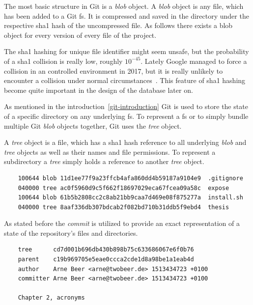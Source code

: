 The most basic structure in Git is a \emph{blob} object.
A \emph{blob} object is any file, which has been added to a Git \ac{fs}.
It is compressed and saved in the  directory under the respective \ac{sha1} hash of the uncompressed file.
As follows there exists a blob object for every version of every file of the project.

The \ac{sha1} hashing for unique file identifier might seem unsafe, but the probability of a \ac{sha1} collision is really low, roughly $10^{-45}$.
Lately Google managed to force a collision in an controlled environment in 2017, but it is really unlikely to encounter a collision under normal circumstances~\cite{techreport:sha-collision}.
This feature of \ac{sha1} hashing become quite important in the design of the database later on.

As mentioned in the introduction~\ref{git-introduction} Git is used to store the state of a specific directory on any underlying \ac{fs}.
To represent a \ac{fs} or to simply bundle multiple Git \emph{blob} objects together, Git uses the \emph{tree} object.

A \emph{tree} object is a file, which has a \ac{sha1} hash reference to all underlying \emph{blob} and \emph{tree} objects as well as their names and file permissions.
To represent a subdirectory a \emph{tree} simply holds a reference to another \emph{tree} object.

\begin{verbatim}
    100644 blob 11d1ee77f9a23ffcb4afa860dd4b59187a9104e9  .gitignore
    040000 tree ac0f5960d9c5f662f18697029eca67fcea09a58c  expose
    100644 blob 61b5b2808cc2c8ab21bb9caa7d469e08f875277a  install.sh
    040000 tree 8aaf336db307bdcab2f082bd710b31ddb5f9ebd4  thesis
\end{verbatim}
\begingroup
{}
\endgroup

As stated before the \emph{commit} is utilized to provide an exact representation of a state of the repository's files and directories.

\begin{verbatim}
    tree      cd7d001b696db430b898b75c633686067e6f0b76
    parent    c19b969705e5eae0ccca2cde1d8a98be1a1eab4d
    author    Arne Beer <arne@twobeer.de> 1513434723 +0100
    committer Arne Beer <arne@twobeer.de> 1513434723 +0100

    Chapter 2, acronyms
\end{verbatim}
\begingroup
{}
\endgroup

